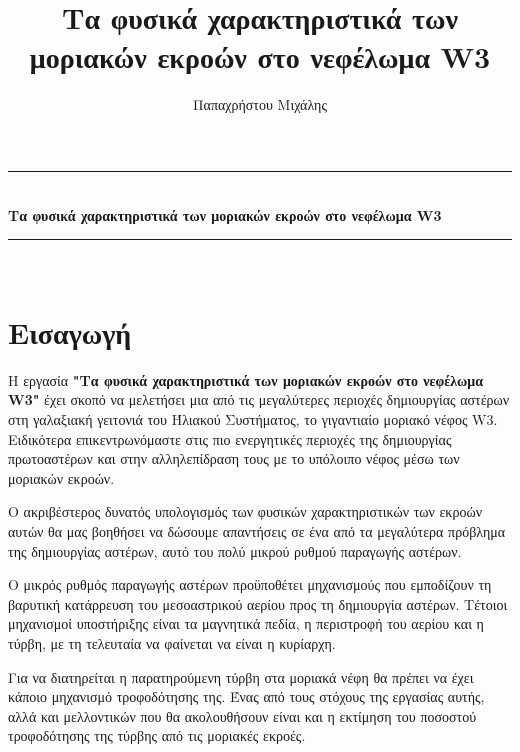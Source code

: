 \documentclass[a4paper,12pt]{memoir}
\title{Τα φυσικά χαρακτηριστικά των μοριακών εκροών στο νεφέλωμα W3}
\author{Παπαχρήστου Μιχάλης}
\newcommand{\HRule}{\rule{\linewidth}{0.5mm}}
\begin{document}
\begin{titlingpage}
	\begin{center}


		\HRule \\[0.4cm]
		{ \huge \bfseries Τα φυσικά χαρακτηριστικά των μοριακών εκροών στο νεφέλωμα W3 \\[0.4cm] }
		\HRule \\[1.5cm]
		\medskip
		
		
		\vfill
		
		
	\end{center}
\end{titlingpage}

\tableofcontents


\chapter{Εισαγωγή}
Η εργασία \textbf{"Τα φυσικά χαρακτηριστικά των μοριακών εκροών στο νεφέλωμα W3"} έχει σκοπό να μελετήσει μια από τις μεγαλύτερες περιοχές δημιουργίας αστέρων στη γαλαξιακή γειτονιά του Ήλιακού Συστήματος, το γιγαντιαίο μοριακό νέφος W3. 
Ειδικότερα επικεντρωνόμαστε στις πιο ενεργητικές περιοχές της δημιουργίας πρωτοαστέρων και στην αλληλεπίδραση τους με το υπόλοιπο νέφος μέσω των μοριακών εκροών. 

O ακριβέστερος δυνατός υπολογισμός των φυσικών χαρακτηριστικών των εκροών αυτών θα μας βοηθήσει να δώσουμε απαντήσεις σε ένα από τα μεγαλύτερα πρόβλημα της δημιουργίας αστέρων, αυτό του πολύ μικρού ρυθμού παραγωγής αστέρων. 

Ο μικρός ρυθμός παραγωγής αστέρων προϋποθέτει μηχανισμούς που εμποδίζουν τη βαρυτική κατάρρευση του μεσοαστρικού αερίου προς τη δημιουργία αστέρων. Τέτοιοι μηχανισμοί υποστήριξης είναι τα μαγνητικά πεδία, η περιστροφή του αερίου και η τύρβη, με τη τελευταία να φαίνεται να είναι η κυρίαρχη.

Για να διατηρείται η παρατηρούμενη τύρβη στα μοριακά νέφη θα πρέπει να έχει κάποιο μηχανισμό τροφοδότησης της. Ένας από τους στόχους της εργασίας αυτής, αλλά και μελλοντικών που θα ακολουθήσουν είναι και η εκτίμηση του ποσοστού τροφοδότησης της τύρβης από τις μοριακές εκροές. 
\end{document}
